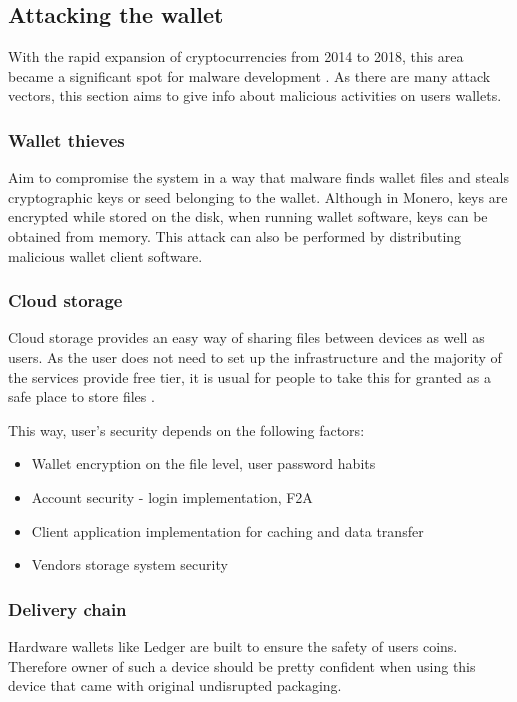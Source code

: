 \documentclass[
  printed, %
  table,   %
  nolof,     %
  nolot,     %
           oneside, color
]{fithesis3}
\begin{document}
\subsection{Attacking the wallet}
With the rapid expansion of cryptocurrencies from 2014 to 2018, this area became a significant spot for malware development \cite{schaupp2018cryptocurrency}. As there are many attack vectors, this section aims to give info about malicious activities on users wallets.

\subsubsection{Wallet thieves}

Aim to compromise the system in a way that malware finds wallet files and steals cryptographic keys or seed belonging to the wallet. Although in Monero, keys are encrypted while stored on the disk, when running wallet software, keys can be obtained from memory. This attack can also be performed by distributing malicious wallet client software.

\subsubsection{Cloud storage}

Cloud storage provides an easy way of sharing files between devices as well as users. As the user does not need to set up the infrastructure and the majority of the services provide free tier, it is usual for people to take this for granted as a safe place to store files \cite{caviglione2017covert}.

This way, user's security depends on the following factors:
\begin{itemize}\itemsep0em
\item Wallet encryption on the file level, user password habits
\item Account security - login implementation, F2A
\item Client application implementation for caching and data transfer
\item Vendors storage system security
\end{itemize} 

\subsubsection{Delivery chain}

Hardware wallets like Ledger are built to ensure the safety of users coins. Therefore owner of such a device should be pretty confident when using this device that came with original undisrupted packaging. 
\end{document}
